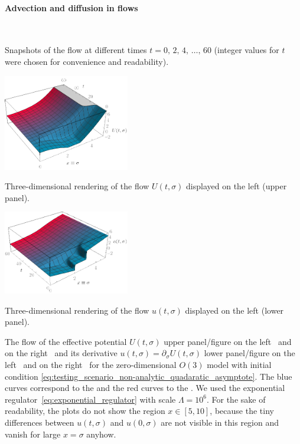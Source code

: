\paragraph{Advection and diffusion in \frg{} flows}\label{paragraph:ONadvDif}\mbox{}\\%
	{%
		\caption{Snapshots of the \frg{} flow at different times ${t = 0, \, 2, \, 4, \, \ldots, \, 60}$ (integer values for $t$ were chosen for convenience and readability).}%
		\label{fig:sc_i_on_3_n_800_xmax_10_lambda_1e6_tir_60_rg_flow_2d}%
	}%
	{%
		\includegraphics[width=5.5cm]{0d/figures/sc_i_on_3_n_800_xmax_10_lambda_1e6_tir_60_rg_flow_u_3d.pdf}
		\caption{Three-dimensional rendering of the flow $U(t,\sigma)$ displayed on the left \dash{}  (upper panel).}%
		\label{fig:sc_i_on_3_n_800_xmax_10_lambda_1e6_tir_60_rg_flow_u_3d}%
	}%
	{%
		\includegraphics[width=5.5cm]{0d/figures/sc_i_on_3_n_800_xmax_10_lambda_1e6_tir_60_rg_flow_du_3d.pdf}
		\caption{Three-dimensional rendering of the flow $u(t,\sigma)$ displayed on the left \dash{}  (lower panel).}%
		\label{fig:sc_i_on_3_n_800_xmax_10_lambda_1e6_tir_60_rg_flow_du_3d}%
	}%
	{%
	The \frg{} flow of the effective potential $U ( t, \sigma )$ \dash{} upper panel/figure on the left~ and on the right~ \dash{} and its derivative $u ( t , \sigma ) = \partial_\sigma U ( t , \sigma )$ \dash{} lower panel/figure on the left~ and on the right~ \dash{} for the zero-dimensional $O ( 3 )$ model with initial condition \eqref{eq:testing_scenario_non-analytic_quadaratic_asymptote}. 
	The blue curves correspond to the \uv{} and the red curves to the \ir{}.
	We used the exponential regulator~\eqref{eq:exponential_regulator} with \uv{} scale $\Lambda = 10^6$.
	For the sake of readability, the plots do not show the region ${x \in[5,10]}$, because the tiny differences between $u ( t , \sigma )$ and $u ( 0 , \sigma )$ are not visible in this region and vanish for large $x = \sigma$ anyhow.
	}%
